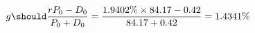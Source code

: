 \begin{align*}
g\should\frac{rP_{0}-D_{0}}{P_{0}+D_{0}}=\frac{1.9402\%\times84.17-0.42}{84.17+0.42}=1.4341\%
\end{align*}
